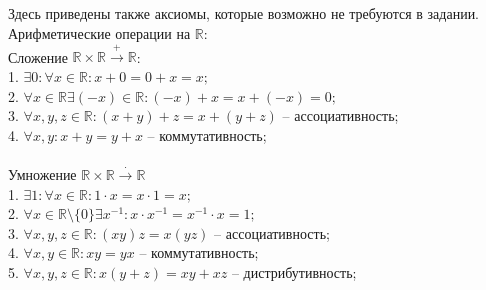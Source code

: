 \subsection{}
	Здесь приведены также аксиомы, которые возможно не требуются в задании.
	Арифметические операции на $\mathbb{R}$:\\
	Сложение $\mathbb{R}\times\mathbb{R}\xrightarrow{+}\mathbb{R}$:\\
	1. $\exists 0: \forall x\in\mathbb{R}:x+0=0+x=x;$\\
	2. $\forall x\in\mathbb{R} \exists (-x)\in\mathbb{R}:(-x)+x=x+(-x)=0;$\\
	3. $\forall x, y, z\in \mathbb{R}: (x + y) + z = x + (y + z)$ -- ассоциативность;\\
	4. $\forall x, y: x + y = y + x$ -- коммутативность;\\\\
	Умножение $\mathbb{R}\times\mathbb{R}\xrightarrow{\cdot}\mathbb{R}$\\
	1. $\exists 1: \forall x\in\mathbb{R}: 1\cdot x=x\cdot 1 = x;$\\
	2. $\forall x\in\mathbb{R}\setminus\{0\}\exists x^{-1}: x\cdot x^{-1} = x^{-1}\cdot x = 1;$\\
	3. $\forall x, y, z\in\mathbb{R}:(xy)z=x(yz)$ -- ассоциативность;\\
	4. $\forall x, y\in\mathbb{R}: xy=yx$ -- коммутативность;\\
	5. $\forall x, y, z\in\mathbb{R}: x(y+z) = xy+xz$ -- дистрибутивность;\\
